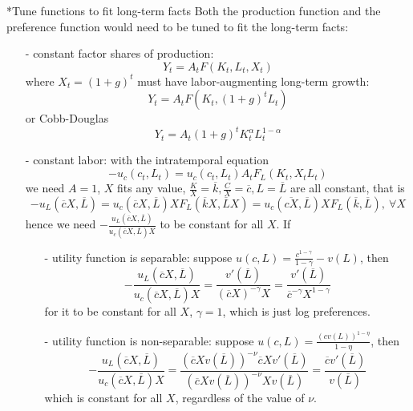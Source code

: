 \documentclass[10pt,landscape,a4paper]{article}
\makeatletter
\let\bar\overline
\renewcommand{\subsubsection}{\@startsection{subsubsection}{1}{0mm}{.2ex}{.2ex}{\bfseries}}
\makeatother
\begin{document}
\begin{multicols*}{3}
\subsubsection*{Tune functions to fit long-term facts}
Both the production function and the preference function would need to be tuned to fit the long-term facts:

\begin{itemize}
    \item[-] constant factor shares of production:
    $$
    Y_t=A_tF(K_t,L_t,X_t)
    $$
    where $X_t=(1+g)^t$ must have labor-augmenting long-term growth:
    $$
    Y_t=A_tF(K_t,(1+g)^tL_t)
    $$
    or Cobb-Douglas
    $$
    Y_t=A_t(1+g)^tK_t^{\alpha}L_t^{1-\alpha}
    $$
    \item[-] constant labor: with the intratemporal equation
    $$
    -u_c(c_t,L_t)=u_c(c_t,L_t)A_tF_L(K_t,X_tL_t)
    $$
    we need $A=1$, $X$ fits any value, $\frac{K}{X}=\bar{k},\frac{C}{X}=\bar{c},L=\bar{L}$ are all constant, that is 
    $$
    -u_L(\bar{c}X,\bar{L})=u_c(\bar{c}X,\bar{L})XF_L(\bar{k}X,\bar{L}X)=u_c(\bar{cX},\bar{L})XF_L(\bar{k},\bar{L}),\ \forall X
    $$
    hence we need $-\frac{u_L(\bar{c}X,\bar{L})}{u_c(\bar{c}X,\bar{L})X}$ to be constant for all $X$. If
    \begin{itemize}
        \item[-] utility function is separable: suppose $u(c,L)=\frac{c^{1-\gamma}}{1-\gamma}-v(L)$, then 
        $$
        -\frac{u_L(\bar{c}X,\bar{L})}{u_c(\bar{c}X,\bar{L})X}=\frac{v'(\bar{L})}{(\bar{c}X)^{-\gamma}X}=\frac{v'(\bar{L})}{\bar{c}^{-\gamma}X^{1-\gamma}}
        $$
        for it to be constant for all $X$, $\gamma=1$, which is just log preferences.
        \item[-] utility function is non-separable: suppose
        $u(c,L)=\frac{(cv(L))^{1-\eta}}{1-\eta}$, then
        $$
        -\frac{u_L(\bar{c}X,\bar{L})}{u_c(\bar{c}X,\bar{L})X} = \frac{(\bar{c}Xv(\bar{L}))^{-\nu}\bar{c}Xv'(\bar{L})}{(\bar{c}Xv(\bar{L}))^{-\nu}Xv(\bar{L})}=\frac{\bar{c}v'(\bar{L})}{v(\bar{L})}
        $$
        which is constant for all $X$, regardless of the value of $\nu$.
    \end{itemize}
\end{itemize}


\end{multicols*}
\end{document}
